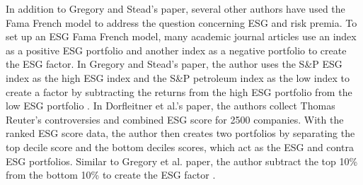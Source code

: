 In addition to Gregory and Stead's paper, several other authors have used the Fama French model to address the question concerning ESG and risk premia. To set up an ESG Fama French model, many academic journal articles use an index as a positive ESG portfolio and another index as a negative portfolio to create the ESG factor. In Gregory and Stead's paper, the author uses the S\&P ESG index as the high ESG index and the S\&P petroleum index as the low index to create a factor by subtracting the returns from the high ESG portfolio from the low ESG portfolio \cite{Gregory2020TheGP}. In Dorfleitner et al.'s paper, the authors collect Thomas Reuter's controversies and combined ESG score for 2500 companies. With the ranked ESG score data, the author then creates two portfolios by separating the top decile score and the bottom deciles scores, which act as the ESG and contra ESG portfolios. Similar to Gregory et al. paper, the author subtract the top 10\% from the bottom 10\% to create the ESG factor \cite{Dorfleitner2020ESGCA}.   
